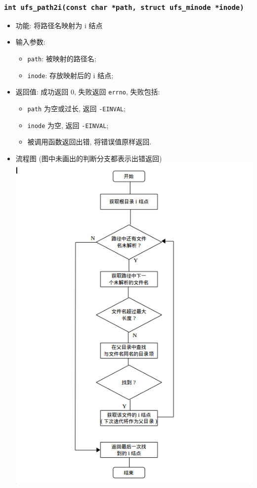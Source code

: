 \documentclass[nofonts]{ctexart}
\begin{document}
  \subsubsection{\texttt{int ufs\_path2i(const char *path, struct ufs\_minode *inode)}}
  \begin{itemize}
\item
  功能: 将路径名映射为 i 结点
\item
  输入参数:

  \begin{itemize}
  \item
    \texttt{path}: 被映射的路径名;
  \item
    \texttt{inode}: 存放映射后的 i 结点;
  \end{itemize}
\item
  返回值: 成功返回 0, 失败返回 \texttt{errno}, 失败包括:

  \begin{itemize}
  \item
    \texttt{path} 为空或过长, 返回 \texttt{-EINVAL};
  \item
    \texttt{inode} 为空, 返回 \texttt{-EINVAL};
  \item
    被调用函数返回出错, 将错误值原样返回.
  \end{itemize}
\item
  流程图 (图中未画出的判断分支都表示出错返回)\\
  \includegraphics[width=15cm]{./images/path2i.png}
  \end{itemize}
\end{document}
